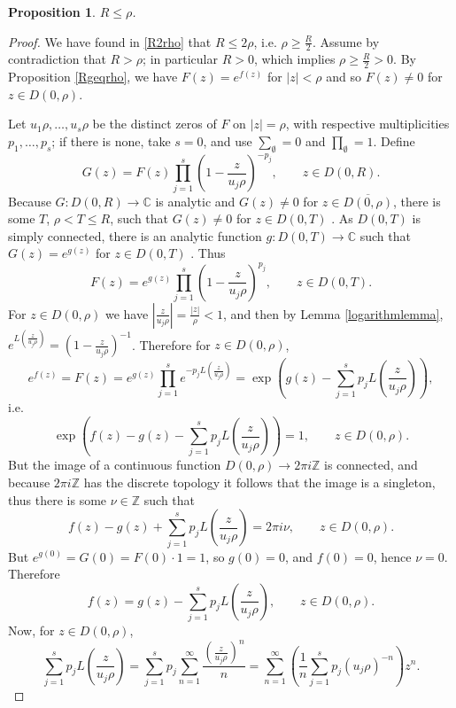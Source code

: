 \documentclass{amsart}
\newtheorem{proposition}[theorem]{Proposition}
\begin{document}
\begin{proposition}
$R \leq \rho$.
\label{Rleqrho}
\end{proposition}
\begin{proof}
We have found in \eqref{R2rho} that  $R \leq 2\rho$, i.e. $\rho \geq \frac{R}{2}$.
Assume by contradiction that $R>\rho$; in particular $R>0$, which implies $\rho \geq \frac{R}{2} > 0$. 
By Proposition \ref{Rgeqrho}, we have $F(z)=e^{f(z)}$ for $|z|<\rho$ and so $F(z) \neq 0$ for $z \in D(0,\rho)$. 

Let $u_1 \rho, \ldots, u_s \rho$ be the distinct zeros of $F$ on $|z|=\rho$, with respective multiplicities $p_1,\ldots,p_s$;
if there is none, take $s=0$, and use $\sum_{\emptyset}=0$ and $\prod_{\emptyset} =1$.
Define
\[
G(z) = F(z)  \prod_{j=1}^s \left(1-\frac{z}{u_j \rho}\right)^{-p_j},\qquad z \in D(0,R).
\]
Because
$G:D(0,R) \to \mathbb{C}$ is analytic and
$G(z) \neq 0$ for $z \in \overline{D(0,\rho)}$,  there is some $T$, $\rho<T \leq R$, such that 
$G(z) \neq 0$ for $z \in D(0,T)$ \cite[p.~208, Theorem 10.18]{rudincomplex}. As $D(0,T)$ is simply connected, there is an analytic function $g:D(0,T) \to \mathbb{C}$ such that
$G(z) = e^{g(z)}$ for $z \in D(0,T)$ \cite[p.~274, Theorem 13.11]{rudincomplex}. Thus
\[
F(z) = e^{g(z)}  \prod_{j=1}^s  \left(1-\frac{z}{u_j \rho}\right)^{p_j},\qquad z \in D(0,T).
\]
For $z \in D(0,\rho)$ we have $\left|\frac{z}{u_j \rho} \right| = \frac{|z|}{\rho}<1$, and then by
Lemma \ref{logarithmlemma}, $e^{L\left(\frac{z}{u_j \rho}\right)} = \left(1-\frac{z}{u_j \rho}\right)^{-1}$.
Therefore for $z \in D(0,\rho)$,
\[
e^{f(z)} = F(z) =  e^{g(z)}  \prod_{j=1}^s e^{-p_j L\left(\frac{z}{u_j \rho}\right)}
= \exp\left( g(z) - \sum_{j=1}^s p_j L\left(\frac{z}{u_j \rho}\right)\right),
\]
i.e.
\[
\exp\left(f(z)-g(z) - \sum_{j=1}^s p_j L\left(\frac{z}{u_j \rho}\right)\right)=1,\qquad z \in D(0,\rho).
\]
But the image of a continuous function $D(0,\rho) \to 2\pi i \mathbb{Z}$ is connected, and because 
$2\pi i \mathbb{Z}$ has the discrete topology
it follows that the image is a singleton,  thus
there is some $\nu \in \mathbb{Z}$ such that 
\[
f(z) - g(z)  + \sum_{j=1}^s p_j L\left(\frac{z}{u_j \rho}\right) = 2\pi i\nu,\qquad z \in D(0,\rho).
\]
But $e^{g(0)} = G(0) = F(0) \cdot 1 = 1$, so $g(0)=0$, and $f(0)=0$, hence $\nu=0$. 
Therefore
\[
f(z) = g(z) - \sum_{j=1}^s p_j L\left(\frac{z}{u_j \rho}\right),\qquad z \in D(0,\rho).
\]
Now, for $z \in D(0,\rho)$, 
\[
\sum_{j=1}^s p_j L\left(\frac{z}{u_j \rho}\right) =\sum_{j=1}^s p_j \sum_{n=1}^\infty \frac{\left(\frac{z}{u_j \rho}\right)^n}{n}
=\sum_{n=1}^\infty  \left(  \frac{1}{n} \sum_{j=1}^s p_j (u_j \rho)^{-n} \right) z^n.
\]
\end{proof}
\end{document}
